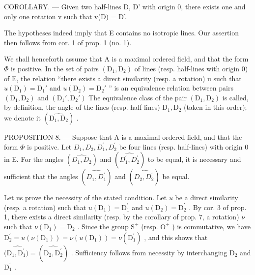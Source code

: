 COROLLARY. --- Given two half-lines D, D' with origin 0, there exists one and only one rotation v such that v(D) = D'.

The hypotheses indeed imply that E contains no isotropic lines. Our assertion then follows from cor. 1 of prop. 1 (no. 1).

We shall henceforth assume that A is a maximal ordered field, and that the form \(\Phi\) is positive. In the set of pairs \((\mathrm{D}_1, \mathrm{D}_2)\) of lines (resp. half-lines with origin 0) of E, the relation “there exists a direct similarity (resp. a rotation) u such that \(u(\mathrm{D}_1) = \mathrm{D}_1'\) and \(u(\mathrm{D}_2) = \mathrm{D}_2'\) ” is an equivalence relation between pairs \((\mathrm{D}_1, \mathrm{D}_2)\) and \((\mathrm{D}_1', \mathrm{D}_2')\) The equivalence class of the pair \((\mathrm{D}_1, \mathrm{D}_2)\) is called, by definition, the angle of the lines (resp. half-lines) \(\mathrm{D}_1, \mathrm{D}_2\) (taken in this order); we denote it \((\widehat{\mathrm{D}_1, \mathrm{D}_2})\) .

PROPOSITION 8. --- Suppose that A is a maximal ordered field, and that the form \(\Phi\) is positive. Let \(D_{1}, D_{2}, D_{1}^{\prime}, D_{2}^{\prime}\) be four lines (resp. half-lines) with origin 0 in E. For the angles \((\widehat{D_{1}, D_{2}})\) and \((\widehat{D_{1}^{\prime}, D_{2}^{\prime}})\) to be equal, it is necessary and sufficient that the angles \((\widehat{D_{1}, D_{1}^{\prime}})\) and \((\widehat{D_{2}, D_{2}^{\prime}})\) be equal.

Let us prove the necessity of the stated condition. Let \(u\) be a direct similarity (resp. a rotation) such that \(u(\mathrm{D}_{1}) = \mathrm{D}_{1}^{\prime}\) and \(u(\mathrm{D}_{2}) = \mathrm{D}_{2}^{\prime}\) . By cor. 3 of prop. 1, there exists a direct similarity (resp. by the corollary of prop. 7, a rotation) \(\nu\) such that \(\nu(\mathrm{D}_{1}) = \mathrm{D}_{2}\) . Since the group \(\mathrm{S}^{+}\) (resp. \(\mathrm{O}^{+}\) ) is commutative, we have \(\mathrm{D}_{2}^{\prime} = u(\nu(\mathrm{D}_{1})) = \nu(u(\mathrm{D}_{1})) = \nu(\mathrm{D}_{1}^{\prime})\) , and this shows that \((\widehat{\mathrm{D}_{1}, \mathrm{D}_{1}^{\prime})} = (\widehat{\mathrm{D}_{2}, \mathrm{D}_{2}^{\prime}})\) . Sufficiency follows from necessity by interchanging \(\mathrm{D}_{2}\) and \(\mathrm{D}_{1}^{\prime}\) .

